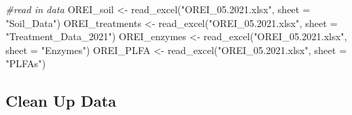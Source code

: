 \documentclass[
]{article}
\newenvironment{Shaded}{\begin{snugshade}}{\end{snugshade}}
\newcommand{\AttributeTok}[1]{\textcolor[rgb]{0.77,0.63,0.00}{#1}}
\newcommand{\CommentTok}[1]{\textcolor[rgb]{0.56,0.35,0.01}{\textit{#1}}}
\newcommand{\FunctionTok}[1]{\textcolor[rgb]{0.00,0.00,0.00}{#1}}
\newcommand{\NormalTok}[1]{#1}
\newcommand{\OtherTok}[1]{\textcolor[rgb]{0.56,0.35,0.01}{#1}}
\newcommand{\StringTok}[1]{\textcolor[rgb]{0.31,0.60,0.02}{#1}}
\begin{document}
\begin{Shaded}
\begin{Highlighting}[]
\CommentTok{\#read in data}
\NormalTok{OREI\_soil }\OtherTok{\textless{}{-}} \FunctionTok{read\_excel}\NormalTok{(}\StringTok{"OREI\_05.2021.xlsx"}\NormalTok{, }\AttributeTok{sheet =} \StringTok{"Soil\_Data"}\NormalTok{)}
\NormalTok{OREI\_treatments }\OtherTok{\textless{}{-}} \FunctionTok{read\_excel}\NormalTok{(}\StringTok{"OREI\_05.2021.xlsx"}\NormalTok{, }\AttributeTok{sheet =} \StringTok{"Treatment\_Data\_2021"}\NormalTok{)}
\NormalTok{OREI\_enzymes }\OtherTok{\textless{}{-}} \FunctionTok{read\_excel}\NormalTok{(}\StringTok{"OREI\_05.2021.xlsx"}\NormalTok{, }\AttributeTok{sheet =} \StringTok{"Enzymes"}\NormalTok{)}
\NormalTok{OREI\_PLFA }\OtherTok{\textless{}{-}} \FunctionTok{read\_excel}\NormalTok{(}\StringTok{"OREI\_05.2021.xlsx"}\NormalTok{, }\AttributeTok{sheet =} \StringTok{"PLFAs"}\NormalTok{)}
\end{Highlighting}
\end{Shaded}

\hypertarget{clean-up-data}{%
\subsection{Clean Up Data}\label{clean-up-data}}
\end{document}
